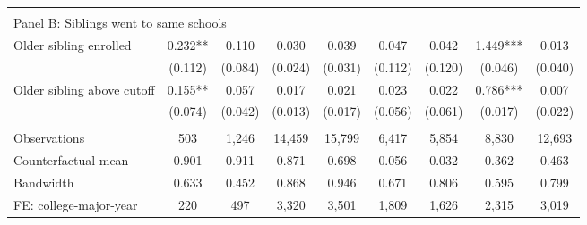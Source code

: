 {{\begin{tabular}{lcccccccc}
&  &  &  & & & & & &    \\
\multicolumn{9}{l}{Panel B: Siblings went to same schools} \\
Older sibling enrolled&       0.232** &       0.110   &       0.030   &       0.039   &       0.047   &       0.042   &       1.449***&       0.013   \\
                    &     (0.112)   &     (0.084)   &     (0.024)   &     (0.031)   &     (0.112)   &     (0.120)   &     (0.046)   &     (0.040)   \\
 
Older sibling above cutoff&       0.155** &       0.057   &       0.017   &       0.021   &       0.023   &       0.022   &       0.786***&       0.007   \\
                    &     (0.074)   &     (0.042)   &     (0.013)   &     (0.017)   &     (0.056)   &     (0.061)   &     (0.017)   &     (0.022)   \\
                    &               &               &               &               &               &               &               &               \\
Observations        &         503   &       1,246   &      14,459   &      15,799   &       6,417   &       5,854   &       8,830   &      12,693   \\
Counterfactual mean &       0.901   &       0.911   &       0.871   &       0.698   &       0.056   &       0.032   &       0.362   &       0.463   \\
Bandwidth           &       0.633   &       0.452   &       0.868   &       0.946   &       0.671   &       0.806   &       0.595   &       0.799   \\
FE: college-major-year&         220   &         497   &       3,320   &       3,501   &       1,809   &       1,626   &       2,315   &       3,019   \\
 

\bottomrule
\end{tabular}
}
}
